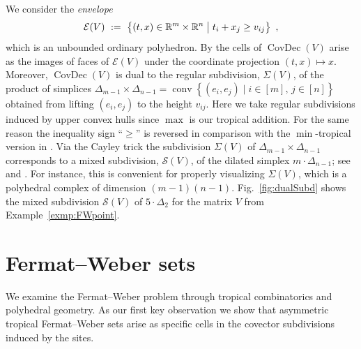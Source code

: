 \documentclass[a4paper,12pt]{amsart}
\newcommand\RR{{\mathbb R}}
\newcommand\cE{{\mathcal E}}
\newcommand\cS{{\mathcal S}}
\newcommand\SetOf[2]{\left\{#1 \mid #2\right\}}
\newcommand\bigSetOf[2]{\bigl\{#1 \bigm| #2\bigr\}}
\DeclareMathOperator\conv{conv}
\DeclareMathOperator\CovDec{CovDec} %
\theoremstyle{remark}
\begin{document}
We consider the \emph{envelope}
\begin{equation}\label{eq:envelope}
  \cE(V) \ := \ \bigSetOf{(t,x)\in\RR^m\times\RR^n}{t_i+x_j \geq v_{ij}} \enspace ,
\end{equation}
which is an unbounded ordinary polyhedron.
By \cite[Theorem 6.14]{ETC} the cells of $\CovDec(V)$ arise as the images of faces of $\cE(V)$ under the coordinate projection $(t,x) \mapsto x$.
Moreover, $\CovDec(V)$ is dual to the regular subdivision, $\Sigma(V)$, of the product of simplices $\Delta_{m-1}\times\Delta_{n-1}=\conv\SetOf{(e_i,e_j)}{i\in[m],\, j\in[n]}$ obtained from lifting $(e_i,e_j)$ to the height $v_{ij}$.
Here we take regular subdivisions induced by upper convex hulls since $\max$ is our tropical addition.
For the same reason the inequality sign \enquote{$\geq$} is reversed in comparison with the $\min$-tropical version in \cite[(6.1)]{ETC}.
Via the Cayley trick the subdivision $\Sigma(V)$ of $\Delta_{m-1}\times\Delta_{n-1}$ corresponds to a mixed subdivision, $\cS(V)$, of the dilated simplex $m\cdot\Delta_{n-1}$; see \cite[]{DLRS} and \cite[]{ETC}.
For instance, this is convenient for properly visualizing $\Sigma(V)$, which is a polyhedral complex of dimension $(m-1)(n-1)$.
Fig.~\ref{fig:dualSubd} shows the mixed subdivision $\cS(V)$ of $5\cdot\Delta_2$ for the matrix $V$ from Example~\ref{exmp:FWpoint}.

\section{Fermat--Weber sets} \label{sec:fermat-weber}
\noindent
We examine the Fermat--Weber problem through tropical combinatorics and polyhedral geometry.
As our first key observation we show that asymmetric tropical Fermat--Weber sets arise as specific cells in the covector subdivisions induced by the sites.
\end{document}
